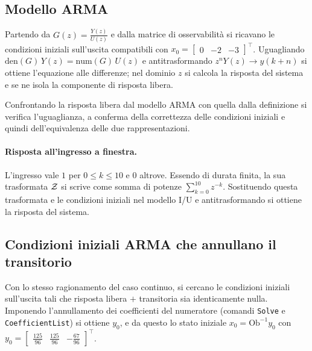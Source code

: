 \subsection{Modello ARMA}
Partendo da $G(z)=\tfrac{Y(z)}{U(z)}$ e dalla matrice di osservabilità si ricavano le
condizioni iniziali sull'uscita compatibili con
$x_0=\begin{bmatrix}0&-2&-3\end{bmatrix}^{\!\top}$. Uguagliando
$\mathrm{den}(G)\,Y(z)=\mathrm{num}(G)\,U(z)$ e antitrasformando $z^nY(z)\to y(k+n)$ si
ottiene l'equazione alle differenze; nel dominio $z$ si calcola la risposta del sistema
e se ne isola la componente di risposta libera.


Confrontando la risposta libera dal modello ARMA con quella dalla definizione si verifica
l'uguaglianza, a conferma della correttezza delle condizioni iniziali e quindi
dell'equivalenza delle due rappresentazioni.

\paragraph{Risposta all'ingresso a finestra.}
L'ingresso vale $1$ per $0\le k\le10$ e $0$ altrove. Essendo di durata finita, la sua
trasformata $\mathcal{Z}$ si scrive come somma di potenze $\sum_{k=0}^{10}z^{-k}$.
Sostituendo questa trasformata e le condizioni iniziali nel modello I/U e
antitrasformando si ottiene la risposta del sistema.


\subsection{Condizioni iniziali ARMA che annullano il transitorio}
Con lo stesso ragionamento del caso continuo, si cercano le condizioni iniziali sull'uscita
tali che risposta libera $+$ transitoria sia identicamente nulla. Imponendo l'annullamento
dei coefficienti del numeratore (comandi \texttt{Solve} e \texttt{CoefficientList}) si
ottiene $y_0$, e da questo lo stato iniziale $x_0=\mathrm{Ob}^{-1}y_0$ con
$y_0=\begin{bmatrix}\tfrac{125}{96}&\tfrac{125}{96}&-\tfrac{67}{96}\end{bmatrix}^{\!\top}$.
